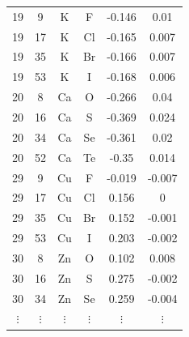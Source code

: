 \documentclass[11pt,oneside,czech,american]{book} %
\theoremstyle{plain}
\theoremstyle{definition}
\begin{document}
\begin{table}
\begin{minipage}{0.5\textwidth}
\begin{tabular}{cccccc}
			19 &     9 & K   & F   & -0.146 &  0.01  \\
			19 &    17 & K   & Cl  & -0.165 &  0.007 \\
			19 &    35 & K   & Br  & -0.166 &  0.007 \\
			19 &    53 & K   & I   & -0.168 &  0.006 \\
			20 &     8 & Ca  & O   & -0.266 &  0.04  \\
			20 &    16 & Ca  & S   & -0.369 &  0.024 \\
			20 &    34 & Ca  & Se  & -0.361 &  0.02  \\
			20 &    52 & Ca  & Te  & -0.35  &  0.014 \\
			29 &     9 & Cu  & F   & -0.019 & -0.007 \\
			29 &    17 & Cu  & Cl  &  0.156 &  0     \\
			29 &    35 & Cu  & Br  &  0.152 & -0.001 \\
			29 &    53 & Cu  & I   &  0.203 & -0.002 \\
			30 &     8 & Zn  & O   &  0.102 &  0.008 \\
			30 &    16 & Zn  & S   &  0.275 & -0.002 \\
			30 &    34 & Zn  & Se  &  0.259 & -0.004 \\
			$\vdots$ & $\vdots$ & $\vdots$ & $\vdots$ & $\vdots$ & $\vdots$  \\ 
			\bottomrule
		\end{tabular}
		

\end{minipage}
\end{table}
\end{document}
